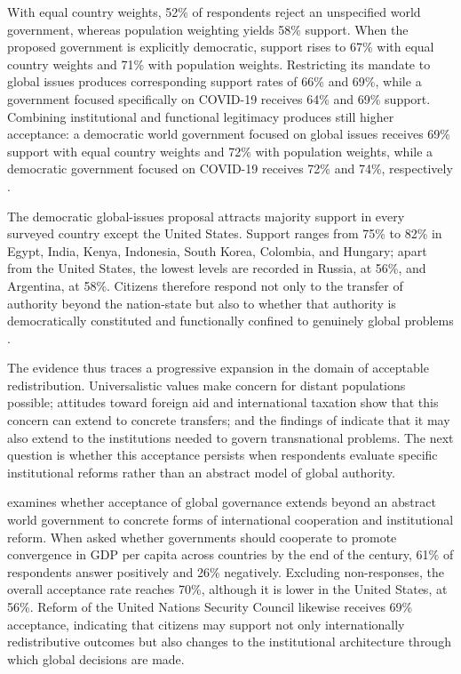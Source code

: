 \documentclass[11pt,a4paper]{article}
\begin{document}
With equal country weights, 52\% of respondents reject an unspecified world government, whereas population weighting yields 58\% support. When the proposed government is explicitly democratic, support rises to 67\% with equal country weights and 71\% with population weights. Restricting its mandate to global issues produces corresponding support rates of 66\% and 69\%, while a government focused specifically on COVID-19 receives 64\% and 69\% support. Combining institutional and functional legitimacy produces still higher acceptance: a democratic world government focused on global issues receives 69\% support with equal country weights and 72\% with population weights, while a democratic government focused on COVID-19 receives 72\% and 74\%, respectively \citep{ghassim_who_2024}.

The democratic global-issues proposal attracts majority support in every surveyed country except the United States. Support ranges from 75\% to 82\% in Egypt, India, Kenya, Indonesia, South Korea, Colombia, and Hungary; apart from the United States, the lowest levels are recorded in Russia, at 56\%, and Argentina, at 58\%. Citizens therefore respond not only to the transfer of authority beyond the nation-state but also to whether that authority is democratically constituted and functionally confined to genuinely global problems \citep{ghassim_who_2024}.

The evidence thus traces a progressive expansion in the domain of acceptable redistribution. Universalistic values make concern for distant populations possible; attitudes toward foreign aid and international taxation show that this concern can extend to concrete transfers; and the findings of \citet{ghassim_who_2024} indicate that it may also extend to the institutions needed to govern transnational problems. The next question is whether this acceptance persists when respondents evaluate specific institutional reforms rather than an abstract model of global authority.

\citet{fabre_public_2026} examines whether acceptance of global governance extends beyond an abstract world government to concrete forms of international cooperation and institutional reform. When asked whether governments should cooperate to promote convergence in GDP per capita across countries by the end of the century, 61\% of respondents answer positively and 26\% negatively. Excluding non-responses, the overall acceptance rate reaches 70\%, although it is lower in the United States, at 56\%. Reform of the United Nations Security Council %
likewise receives 69\% acceptance, indicating that citizens may support not only internationally redistributive outcomes but also changes to the institutional architecture through which global decisions are made.
\end{document}
